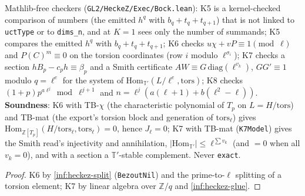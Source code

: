 \begin{definition}\label{chk:hz-k5k8}
  \leanok
  Mathlib-free checkers (\texttt{GL2/HeckeZ/Exec/Bock.lean}): K5 is a kernel-checked comparison of numbers (the emitted $h^q$ with $b_q+t_q+t_{q+1}$) that is not linked to \texttt{uctType} or to \texttt{dims\_n}, and at $K=1$ sees only the number of summands; K5 compares the emitted $h^q$ with $b_q+t_q+t_{q+1}$; K6 checks
  $u\chi+vP\equiv1\pmod\ell$ and $P(C)^m\equiv0$ on the torsion coordinates (row $i$ modulo $\ell^{\sigma_i}$); K7 checks a section
  $hB_p-c_ph\equiv\beta_p$ and a Smith certificate $AW\equiv G\,\mathrm{diag}(\ell^{v_k})$, $GG'\equiv1$ modulo $q=\ell^e$ for the system of
  $\mathrm{Hom}_{\mathbb T'}(L/\ell^e,\mathrm{tors})$; K8 checks $(1+p)p^{a\ell^j}\bmod\ell^{j+1}$ and $n=\ell^j(a(\ell+1)+b(\ell^2-\ell))$.
  \textbf{Soundness}: K6 with TB-$\chi$ (the characteristic polynomial of $T_p$ on $L=H/\mathrm{tors}$) and TB-mat (the export's torsion block and
  generation of $\mathrm{tors}_\ell$) gives $\mathrm{Hom}_{\mathbb Z[T_p]}(H/\mathrm{tors}_\ell,\mathrm{tors}_\ell)=0$, hence $J_\ell=0$; K7 with TB-mat
  (\texttt{K7Model}) gives the Smith read's injectivity and annihilation, $|\mathrm{Hom}_{\mathbb T'}|\le\ell^{\sum v_k}$ (and $=0$ when all $v_k=0$),
  and with a section a $\mathbb T'$-stable complement. Never \texttt{exact}.
\end{definition}
\begin{proof}
  \leanok
  K6 by \ref{inf:heckez-split} (\texttt{BezoutNil}) and the prime-to-$\ell$ splitting of a torsion element; K7 by linear algebra over
  $\mathbb Z/q$ and \ref{inf:heckez-glue}.
\end{proof}

